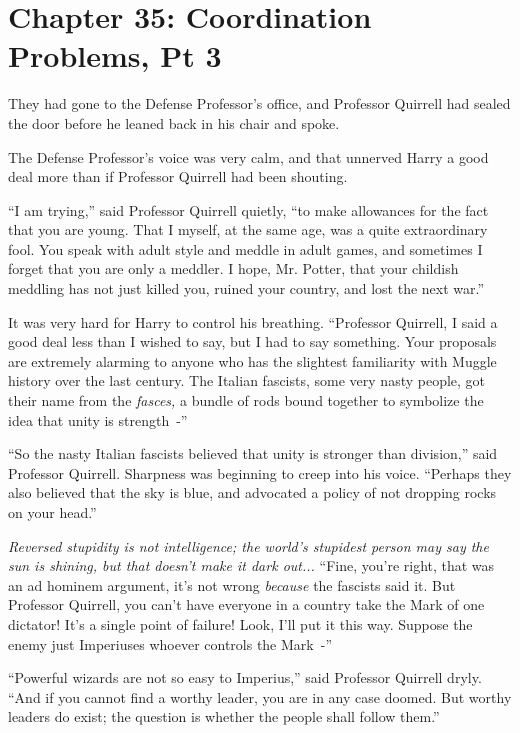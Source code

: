 \chapter{Chapter 35: Coordination Problems, Pt 3}
They had gone to the Defense Professor's office, and Professor Quirrell had sealed the door before he leaned back in his chair and spoke.

The Defense Professor's voice was very calm, and that unnerved Harry a good deal more than if Professor Quirrell had been shouting.

``I am trying,'' said Professor Quirrell quietly, ``to make allowances for the fact that you are young. That I myself, at the same age, was a quite extraordinary fool. You speak with adult style and meddle in adult games, and sometimes I forget that you are only a meddler. I hope, Mr. Potter, that your childish meddling has not just killed you, ruined your country, and lost the next war.''

It was very hard for Harry to control his breathing. ``Professor Quirrell, I said a good deal less than I wished to say, but I had to say something. Your proposals are extremely alarming to anyone who has the slightest familiarity with Muggle history over the last century. The Italian fascists, some very nasty people, got their name from the \emph{fasces,} a bundle of rods bound together to symbolize the idea that unity is strength~-''

``So the nasty Italian fascists believed that unity is stronger than division,'' said Professor Quirrell. Sharpness was beginning to creep into his voice. ``Perhaps they also believed that the sky is blue, and advocated a policy of not dropping rocks on your head.''

\emph{Reversed stupidity is not intelligence; the world's stupidest person may say the sun is shining, but that doesn't make it dark out...} ``Fine, you're right, that was an ad hominem argument, it's not wrong \emph{because} the fascists said it. But Professor Quirrell, you can't have everyone in a country take the Mark of one dictator! It's a single point of failure! Look, I'll put it this way. Suppose the enemy just Imperiuses whoever controls the Mark~-''

``Powerful wizards are not so easy to Imperius,'' said Professor Quirrell dryly. ``And if you cannot find a worthy leader, you are in any case doomed. But worthy leaders do exist; the question is whether the people shall follow them.''

